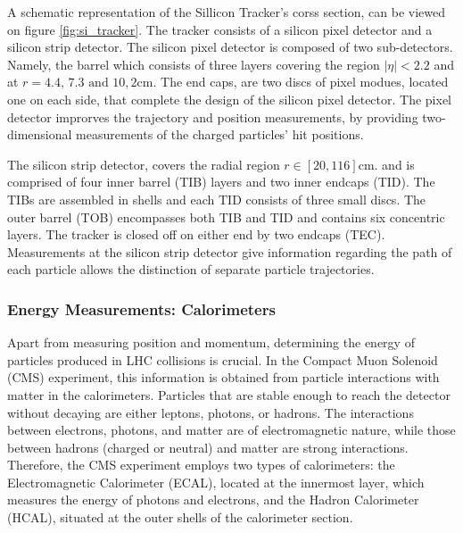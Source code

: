 A schematic representation of the Sillicon Tracker's corss section, can be viewed on figure \ref{fig:si_tracker}\cite{Chatrchyan:1129810}. The tracker consists of a silicon pixel detector and a silicon strip detector. The silicon pixel detector is composed of two sub-detectors. Namely, the barrel which consists of three layers covering the region \(|\eta| < 2.2\) and at \(r = 4.4\text{, }7.3\text{ and }10,2\text{cm}\). The end caps, are two discs of pixel modues, located one on each side, that complete the design of the silicon pixel detector. The pixel detector improrves the trajectory and position measurements, by providing two-dimensional measurements of the charged particles' hit positions.

The silicon strip detector, covers the radial region \(r \in \left[ 20, 116 \right]\text{cm}\). and  is comprised of four inner barrel (TIB) layers and two inner endcaps (TID). The TIBs are assembled in shells and each TID consists of three small discs. The outer barrel (TOB) encompasses both TIB and TID and contains six concentric layers. The tracker is closed off on either end by two endcaps (TEC). Measurements at the silicon strip detector give information regarding the path of each particle allows the distinction of separate particle trajectories.

\subsubsection{Energy Measurements: Calorimeters}
\label{sec:orgeca8eed}
Apart from measuring position and momentum, determining the energy of particles produced in LHC collisions is crucial. In the Compact Muon Solenoid (CMS) experiment, this information is obtained from particle interactions with matter in the calorimeters. Particles that are stable enough to reach the detector without decaying are either leptons, photons, or hadrons. The interactions between electrons, photons, and matter are of electromagnetic nature, while those between hadrons (charged or neutral) and matter are strong interactions. Therefore, the CMS experiment employs two types of calorimeters: the Electromagnetic Calorimeter (ECAL), located at the innermost layer, which measures the energy of photons and electrons, and the Hadron Calorimeter (HCAL), situated at the outer shells of the calorimeter section.


